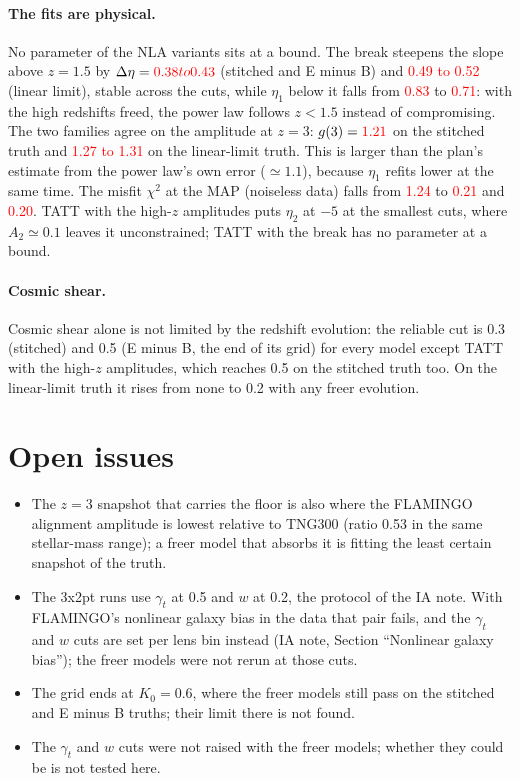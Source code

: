 \documentclass[11pt]{article}
\newif\ifnumbersfinal
\newcommand{\refresh}[1]{\ifnumbersfinal#1\else\textcolor{red}{#1}\fi}
\newcommand{\ChiNLA}{\refresh{1.24}}      %
\newcommand{\ChiBk}{\refresh{0.21}}
\newcommand{\ChiHz}{\refresh{0.20}}
\newcommand{\EtaNLA}{\refresh{0.83}}      %
\newcommand{\EtaBk}{\refresh{0.71}}
\newcommand{\DetaS}{\refresh{0.38 to 0.43}}  %
\newcommand{\DetaL}{\refresh{0.49 to 0.52}}  %
\newcommand{\GthreeS}{\refresh{1.21}}     %
\newcommand{\GthreeL}{\refresh{1.27 to 1.31}} %
\begin{document}
\paragraph{The fits are physical.}
No parameter of the NLA variants sits at a bound. The break steepens the
slope above $z = 1.5$ by $\Delta\eta = \DetaS$ (stitched and E minus B) and
\DetaL{} (linear limit), stable across the cuts, while $\eta_1$ below it
falls from \EtaNLA{} to \EtaBk: with the high redshifts freed, the power law
follows $z < 1.5$ instead of compromising. The two families agree on the
amplitude at $z = 3$: $g(3) = \GthreeS$ on the stitched truth and \GthreeL{}
on the linear-limit truth. This is larger than the plan's estimate from the
power law's own error ($\simeq 1.1$), because $\eta_1$ refits lower at the
same time. The misfit $\chi^2$ at the MAP (noiseless data) falls from
\ChiNLA{} to \ChiBk{} and \ChiHz. TATT with the high-$z$ amplitudes puts
$\eta_2$ at $-5$ at the smallest cuts, where $A_2 \simeq 0.1$ leaves it
unconstrained; TATT with the break has no parameter at a bound.

\paragraph{Cosmic shear.}
Cosmic shear alone is not limited by the redshift evolution: the reliable
cut is 0.3 (stitched) and 0.5 (E minus B, the end of its grid) for every
model except TATT with the high-$z$ amplitudes, which reaches 0.5 on the
stitched truth too. On the
linear-limit truth it rises from none to 0.2 with any freer evolution.

\section{Open issues}
\begin{itemize}
  \item The $z = 3$ snapshot that carries the floor is also where the
    FLAMINGO alignment amplitude is lowest relative to TNG300 (ratio 0.53 in
    the same stellar-mass range); a freer model that absorbs it is fitting the
    least certain snapshot of the truth.
  \item The 3x2pt runs use $\gamma_t$ at 0.5 and $w$ at 0.2, the protocol of
    the IA note. With FLAMINGO's nonlinear galaxy bias in the data that pair
    fails, and the $\gamma_t$ and $w$ cuts are set per lens bin instead
    (IA note, Section ``Nonlinear galaxy bias''); the freer models were not
    rerun at those cuts.
  \item The grid ends at $K_0 = 0.6$, where the freer models still pass on
    the stitched and E minus B truths; their limit there is not found.
  \item The $\gamma_t$ and $w$ cuts were not raised with the freer models;
    whether they could be is not tested here.
\end{itemize}
\end{document}
